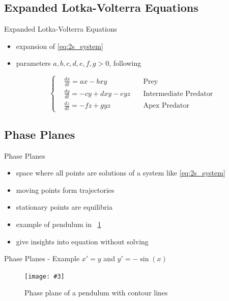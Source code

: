 \documentclass[hyperref={colorlinks,allcolors=black}]{beamer}
\newcommand{\figref}[1]{\textsc{\figurename}~\ref{#1}}
\newcommand{\makefig}[4]{
\begin{figure}[#1]
    \captionsetup{justification=centering}
    \texttt{[image: \#3]}
    \caption{#4}
    \label{fig:#3}
\end{figure}
}
\begin{document}
\subsection[Expanded Equations]{Expanded Lotka-Volterra Equations}

\begin{frame}{Expanded Lotka-Volterra Equations}
    \begin{itemize}
\setlength\itemsep{1em}
        \item expansion of \eqref{eq:2s_system}
        \item parameters $a,b,c,d,e,f,g>0$, following \cite{chauvet}
    \end{itemize}
\begin{equation}
    \left\{\begin{aligned}
        &\frac{dx}{dt} = ax - bxy              &\text{Prey}\\
        &\frac{dy}{dt} = -cy + dxy - eyz \quad &\text{Intermediate Predator}\\
        &\frac{dz}{dt} = -fz + gyz             &\text{Apex Predator}
    \end{aligned}\right.
    \label{eq:3s_system}
\end{equation}
\end{frame}

\subsection{Phase Planes}

\begin{frame}{Phase Planes}
    \begin{itemize}
\setlength\itemsep{1em}
        \item space where all points are solutions of a system like
            \eqref{eq:2s_system}
        \item moving points form trajectories
        \item stationary points are equilibria \cite{terman}
        \item example of pendulum in \figref{fig:example_phase_plane}
        \item give insights into equation without solving
    \end{itemize}
\end{frame}

\begin{frame}{Phase Planes - Example}
$x'=y$ and $y'=-\sin(x)$
    \makefig{h}{0.7\textheight}{example_phase_plane}{Phase plane of a pendulum with contour lines}
\end{frame}
\end{document}
